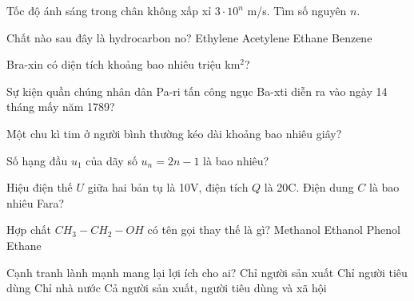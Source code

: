\begin{ex}
    Tốc độ ánh sáng trong chân không xấp xỉ $3 \cdot 10^n$ m/s. Tìm số nguyên $n$.
\end{ex}
\begin{ex}
    Chất nào sau đây là hydrocarbon no?
    \choice
    {Ethylene}
    {Acetylene}
    {\True Ethane}
    {Benzene}
\end{ex}
\begin{ex}
    Bra-xin có diện tích khoảng bao nhiêu triệu km$^2$?
\end{ex}
\begin{ex}
    Sự kiện quần chúng nhân dân Pa-ri tấn công ngục Ba-xti diễn ra vào ngày 14 tháng mấy năm 1789?
\end{ex}
\begin{ex}
    Một chu kì tim ở người bình thường kéo dài khoảng bao nhiêu giây?
\end{ex}
\begin{ex}
    Số hạng đầu $u_1$ của dãy số $u_n = 2n - 1$ là bao nhiêu?
\end{ex}
\begin{ex}
    Hiệu điện thế $U$ giữa hai bản tụ là 10V, điện tích $Q$ là 20C. Điện dung $C$ là bao nhiêu Fara?
\end{ex}
\begin{ex}
    Hợp chất $CH_3-CH_2-OH$ có tên gọi thay thế là gì?
    \choice
    {Methanol}
    {\True Ethanol}
    {Phenol}
    {Ethane}
\end{ex}
\begin{ex}
\end{ex}
\begin{ex}
    Cạnh tranh lành mạnh mang lại lợi ích cho ai?
    \choice
    {Chỉ người sản xuất}
    {Chỉ người tiêu dùng}
    {Chỉ nhà nước}
    {\True Cả người sản xuất, người tiêu dùng và xã hội}
\end{ex}
